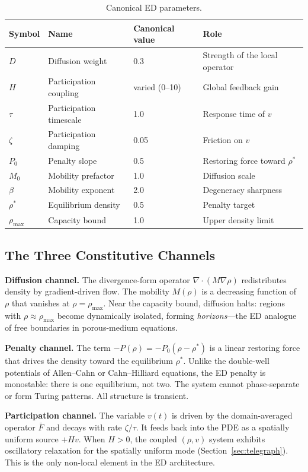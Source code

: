 \documentclass[11pt]{article}
\begin{document}
\begin{table}[h]
\centering
\begin{tabular}{@{}llll@{}}
\toprule
Symbol & Name & Canonical value & Role \\
\midrule
\(D\) & Diffusion weight & 0.3 & Strength of the local operator \\
\(H\) & Participation coupling & varied (0--10) & Global feedback gain \\
\(\tau\) & Participation timescale & 1.0 & Response time of \(v\) \\
\(\zeta\) & Participation damping & 0.05 & Friction on \(v\) \\
\(P_0\) & Penalty slope & 0.5 & Restoring force toward \(\rho^*\) \\
\(M_0\) & Mobility prefactor & 1.0 & Diffusion scale \\
\(\beta\) & Mobility exponent & 2.0 & Degeneracy sharpness \\
\(\rho^*\) & Equilibrium density & 0.5 & Penalty target \\
\(\rho_{\max}\) & Capacity bound & 1.0 & Upper density limit \\
\bottomrule
\end{tabular}
\caption{Canonical ED parameters.}
\label{tab:params}
\end{table}

\subsection{The Three Constitutive Channels}

\textbf{Diffusion channel.} The divergence-form operator \(\nabla\!\cdot\!(M\nabla\rho)\) redistributes density by gradient-driven flow. The mobility \(M(\rho)\) is a decreasing function of \(\rho\) that vanishes at \(\rho = \rho_{\max}\). Near the capacity bound, diffusion halts: regions with \(\rho \approx \rho_{\max}\) become dynamically isolated, forming \emph{horizons}---the ED analogue of free boundaries in porous-medium equations.

\textbf{Penalty channel.} The term \(-P(\rho) = -P_0(\rho - \rho^*)\) is a linear restoring force that drives the density toward the equilibrium \(\rho^*\). Unlike the double-well potentials of Allen--Cahn or Cahn--Hilliard equations, the ED penalty is monostable: there is one equilibrium, not two. The system cannot phase-separate or form Turing patterns. All structure is transient.

\textbf{Participation channel.} The variable \(v(t)\) is driven by the domain-averaged operator \(\bar{F}\) and decays with rate \(\zeta/\tau\). It feeds back into the PDE as a spatially uniform source \(+Hv\). When \(H > 0\), the coupled \((\rho, v)\) system exhibits oscillatory relaxation for the spatially uniform mode (Section~\ref{sec:telegraph}). This is the only non-local element in the ED architecture.
\end{document}
